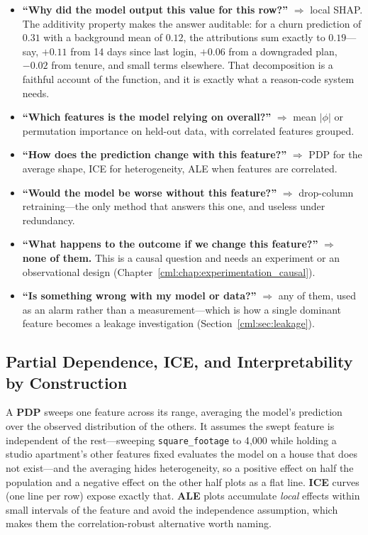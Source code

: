 \begin{itemize}
    \item \textbf{``Why did the model output this value for this row?''} $\Rightarrow$ local SHAP. The additivity property makes the answer auditable: for a churn prediction of $0.31$ with a background mean of $0.12$, the attributions sum exactly to $0.19$---say, $+0.11$ from 14 days since last login, $+0.06$ from a downgraded plan, $-0.02$ from tenure, and small terms elsewhere. That decomposition is a faithful account of the function, and it is exactly what a reason-code system needs.
    \item \textbf{``Which features is the model relying on overall?''} $\Rightarrow$ mean $|\phi|$ or permutation importance on held-out data, with correlated features grouped.
    \item \textbf{``How does the prediction change with this feature?''} $\Rightarrow$ PDP for the average shape, ICE for heterogeneity, ALE when features are correlated.
    \item \textbf{``Would the model be worse without this feature?''} $\Rightarrow$ drop-column retraining---the only method that answers this one, and useless under redundancy.
    \item \textbf{``What happens to the outcome if we change this feature?''} $\Rightarrow$ \textbf{none of them.} This is a causal question and needs an experiment or an observational design (Chapter~\ref{cml:chap:experimentation_causal}).
    \item \textbf{``Is something wrong with my model or data?''} $\Rightarrow$ any of them, used as an alarm rather than a measurement---which is how a single dominant feature becomes a leakage investigation (Section~\ref{cml:sec:leakage}).
\end{itemize}

\subsection{Partial Dependence, ICE, and Interpretability by Construction}

A \textbf{PDP} sweeps one feature across its range, averaging the model's prediction over the observed distribution of the others. It assumes the swept feature is independent of the rest---sweeping \texttt{square\_footage} to 4{,}000 while holding a studio apartment's other features fixed evaluates the model on a house that does not exist---and the averaging hides heterogeneity, so a positive effect on half the population and a negative effect on the other half plots as a flat line. \textbf{ICE} curves (one line per row) expose exactly that. \textbf{ALE} plots accumulate \emph{local} effects within small intervals of the feature and avoid the independence assumption, which makes them the correlation-robust alternative worth naming.

